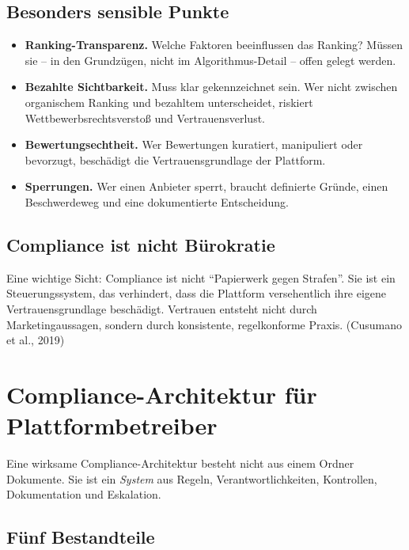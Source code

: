 \documentclass[11pt,a4paper,oneside]{article}
\newcommand{\quelle}[1]{{\footnotesize\color{lpGray}(#1)}}
\begin{document}
\subsection{Besonders sensible Punkte}

\begin{itemize}
  \item \textbf{Ranking-Transparenz.} Welche Faktoren beeinflussen das Ranking? Müssen sie -- in den Grundzügen, nicht im Algorithmus-Detail -- offen gelegt werden.
  \item \textbf{Bezahlte Sichtbarkeit.} Muss klar gekennzeichnet sein. Wer nicht zwischen organischem Ranking und bezahltem unterscheidet, riskiert Wettbewerbsrechtsverstoß und Vertrauensverlust.
  \item \textbf{Bewertungsechtheit.} Wer Bewertungen kuratiert, manipuliert oder bevorzugt, beschädigt die Vertrauensgrundlage der Plattform.
  \item \textbf{Sperrungen.} Wer einen Anbieter sperrt, braucht definierte Gründe, einen Beschwerdeweg und eine dokumentierte Entscheidung.
\end{itemize}

\subsection{Compliance ist nicht Bürokratie}

Eine wichtige Sicht: Compliance ist nicht ``Papierwerk gegen Strafen''. Sie ist ein Steuerungssystem, das verhindert, dass die Plattform versehentlich ihre eigene Vertrauensgrundlage beschädigt. Vertrauen entsteht nicht durch Marketingaussagen, sondern durch konsistente, regelkonforme Praxis. \quelle{Cusumano et al., 2019}

\section{Compliance-Architektur für Plattformbetreiber}

Eine wirksame Compliance-Architektur besteht nicht aus einem Ordner Dokumente. Sie ist ein \emph{System} aus Regeln, Verantwortlichkeiten, Kontrollen, Dokumentation und Eskalation.

\subsection{Fünf Bestandteile}
\end{document}
